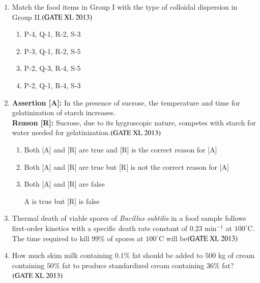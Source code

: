 \documentclass[journal]{IEEEtran}
\begin{document}
\begin{enumerate}
\item Match the food items in Group I with the type of colloidal dispersion in Group II.\hfill $\left(\text{GATE XL 2013}\right)$
\begin{enumerate}
    \item P-4, Q-1, R-2, S-3
    \item P-3, Q-1, R-2, S-5
    \item P-2, Q-3, R-4, S-5
    \item P-2, Q-1, R-4, S-3
\end{enumerate}

\item 
\textbf{Assertion [A]:} In the presence of sucrose, the temperature and time for gelatinization of starch increases.\\
\textbf{Reason [R]:} Sucrose, due to its hygroscopic nature, competes with starch for water needed for gelatinization.\hfill $\left(\text{GATE XL 2013}\right)$
\begin{enumerate}
    \item Both [A] and [R] are true and [R] is the correct reason for [A]
    \item Both [A] and [R] are true but [R] is not the correct reason for [A]
    \item Both [A] and [R] are false
    \item [A] is true but [R] is false
\end{enumerate}

\item Thermal death of viable spores of \textit{Bacillus subtilis} in a food sample follows first-order kinetics with a specific death rate constant of $0.23$ min$^{-1}$ at $100^{\circ}$C. The time  required to kill $99\%$ of spores at $100^{\circ}$C will be\hfill $\left(\text{GATE XL 2013}\right)$
\begin{enumerate}
\end{enumerate}

\item How much skim milk  containing $0.1\%$ fat should be added to $500$ kg of cream containing $50\%$ fat to produce standardized cream containing $36\%$ fat?\hfill $\left(\text{GATE XL 2013}\right)$
\begin{enumerate}
\end{enumerate}


\end{enumerate}
\end{document}
